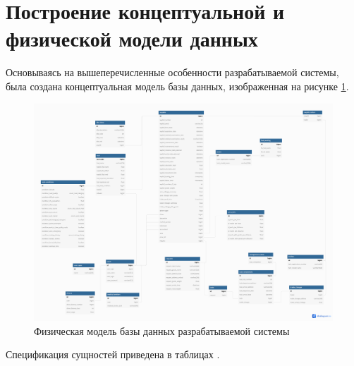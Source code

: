 \documentclass[../nirs.tex]{subfiles}
\begin{document}
\section{Построение концептуальной и физической модели данных}
Основываясь на вышеперечисленные особенности разрабатываемой системы, была
создана концептуальная модель базы данных, изображенная на рисунке
\ref{fig:3_1_db_conceptual}.

\begin{figure}[H]
	\centering
	\includegraphics[keepaspectratio,width=\textwidth]{./images/3_1_db_conceptual.png}
	\caption{Физическая модель базы данных разрабатываемой системы}
	\label{fig:3_1_db_conceptual}
\end{figure}

Спецификация сущностей приведена в таблицах .


















\end{document}
